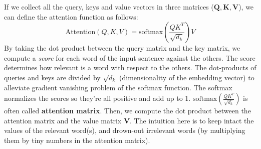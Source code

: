 If we collect all the query, keys and value vectors in three matrices ($\textbf{Q}, \textbf{K}, \textbf{V}$), we can define the attention function as follows:
\[\text{Attention}(Q,K,V) = \text{softmax}\left(\frac{QK^T}{\sqrt{d_k}}\right)V\]
By taking the dot product between the query matrix and the key matrix, we compute a \textit{score} for each word of the input sentence against the others. The score determines how relevant is a word with respect to the others. The dot-products of queries and keys are divided by $\sqrt{d_k}$ (dimensionality of the embedding vector) to alleviate gradient vanishing problem of the softmax function. The softmax normalizes the scores so they’re all positive and add up to 1. $\text{softmax}\left(\frac{QK^T}{\sqrt{d_k}}\right)$ is often called \textbf{attention matrix}.\newline\newline
Then, we compute the dot product between the attention matrix and the value matrix $\textbf{V}$. The intuition here is to keep intact the values of the relevant word(s), and drown-out irrelevant words (by multiplying them by tiny numbers in the attention matrix).

